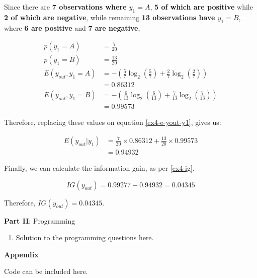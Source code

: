 \documentclass[12pt]{article}
\begin{document}
\begin{enumerate}[leftmargin=\labelsep]
          Since there are \textbf{7 observations where \(y_1 = A\)}, \textbf{5 of which are positive} while \textbf{2 of which are negative},
          while remaining \textbf{13 observations have \(y_1 = B\)}, where \textbf{6 are positive} and \textbf{7 are negative},

          \[
              \begin{aligned}
                  p(y_1 = A)          & = \frac{7}{20}                                                                                               \\
                  p(y_1 = B)          & = \frac{13}{20}                                                                                              \\
                  E(y_{out}, y_1 = A) & = - \left(\frac{5}{7} \log_2\left(\frac{5}{7}\right) + \frac{2}{7} \log_2\left(\frac{2}{7}\right)\right)     \\
                                      & = 0.86312                                                                                                    \\
                  E(y_{out}, y_1 = B) & = - \left(\frac{6}{13} \log_2\left(\frac{6}{13}\right) + \frac{7}{13} \log_2\left(\frac{7}{13}\right)\right) \\
                                      & = 0.99573
              \end{aligned}
          \]

          Therefore, replacing these values on equation \eqref{ex4-e-yout-y1}, gives us:

          \[
              \begin{aligned}
                  E(y_{out} | y_1) & = \frac{7}{20} \times 0.86312 + \frac{13}{20} \times 0.99573 \\
                                   & = 0.94932
              \end{aligned}
          \]

          Finally, we can calculate the information gain, as per \eqref{ex4-ig},

          \[
              IG(y_{out}) = 0.99277 - 0.94932 = 0.04345
          \]

          Therefore, \(IG(y_{out}) = 0.04345\).
\end{enumerate}

\center\large{\textbf{Part II}: Programming}

\begin{enumerate}[leftmargin=\labelsep,resume]
    \item Solution to the programming questions here.
\end{enumerate}

\center\large{\textbf{Appendix}\vskip 0.3cm}

Code can be included here.
\end{document}
